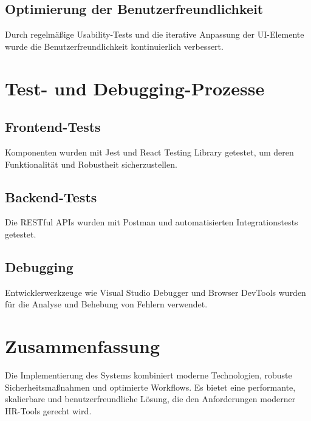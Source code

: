 \subsection{Optimierung der Benutzerfreundlichkeit}
Durch regelmäßige Usability-Tests und die iterative Anpassung der UI-Elemente wurde die Benutzerfreundlichkeit kontinuierlich verbessert.

\section{Test- und Debugging-Prozesse}
\subsection{Frontend-Tests}
Komponenten wurden mit Jest und React Testing Library getestet, um deren Funktionalität und Robustheit sicherzustellen.

\subsection{Backend-Tests}
Die RESTful APIs wurden mit Postman und automatisierten Integrationstests getestet.

\subsection{Debugging}
Entwicklerwerkzeuge wie Visual Studio Debugger und Browser DevTools wurden für die Analyse und Behebung von Fehlern verwendet.

\section{Zusammenfassung}
Die Implementierung des Systems kombiniert moderne Technologien, robuste Sicherheitsmaßnahmen und optimierte Workflows. Es bietet eine performante, skalierbare und benutzerfreundliche Lösung, die den Anforderungen moderner HR-Tools gerecht wird.
